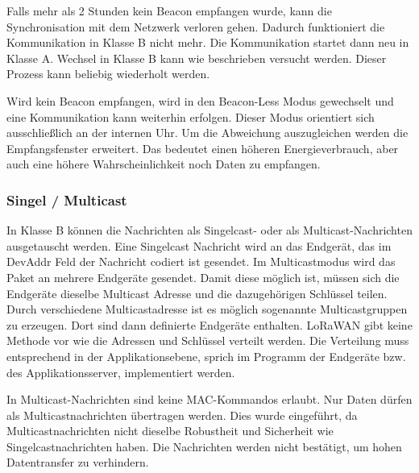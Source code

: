 \documentclass[a4paper, 12pt]{article}
\begin{document}
                Falls mehr als 2 Stunden kein Beacon empfangen wurde, kann die Synchronisation mit dem Netzwerk 
                verloren gehen. Dadurch funktioniert die Kommunikation in Klasse B nicht mehr. Die Kommunikation startet 
                dann neu in Klasse A. Wechsel in Klasse B kann wie beschrieben versucht werden. 
                Dieser Prozess kann beliebig wiederholt werden.

                Wird kein Beacon empfangen, wird in den Beacon-Less Modus gewechselt und eine Kommunikation kann 
                weiterhin erfolgen. Dieser Modus orientiert sich ausschließlich an der internen Uhr.
                Um die Abweichung auszugleichen werden die Empfangsfenster erweitert. Das bedeutet einen höheren 
                Energieverbrauch, aber auch eine höhere Wahrscheinlichkeit noch 
                Daten zu empfangen.

            \subsubsection{Singel / Multicast}
                In Klasse B können die Nachrichten als Singelcast- oder als Multicast-Nachrichten ausgetauscht werden. 
                Eine Singelcast Nachricht wird an das Endgerät, das im DevAddr Feld der Nachricht codiert ist gesendet.
                Im Multicastmodus wird das Paket an mehrere Endgeräte gesendet. Damit diese möglich ist, müssen sich 
                die Endgeräte dieselbe Multicast Adresse und die dazugehörigen Schlüssel teilen. Durch verschiedene 
                Multicastadresse ist es möglich sogenannte Multicastgruppen zu erzeugen. Dort sind dann definierte 
                Endgeräte enthalten. LoRaWAN gibt keine Methode vor wie die Adressen und 
                Schlüssel verteilt werden. Die Verteilung muss entsprechend in der Applikationsebene, sprich im Programm der 
                Endgeräte bzw. des Applikationsserver, implementiert werden. 

                In Multicast-Nachrichten sind keine MAC-Kommandos erlaubt. Nur Daten dürfen als Multicastnachrichten 
                übertragen werden. Dies wurde eingeführt, da Multicastnachrichten nicht dieselbe Robustheit und Sicherheit wie 
                Singelcastnachrichten haben. Die Nachrichten werden nicht bestätigt, um hohen Datentransfer zu verhindern.\cite[S.84]{LoRaSpec}
\end{document}
